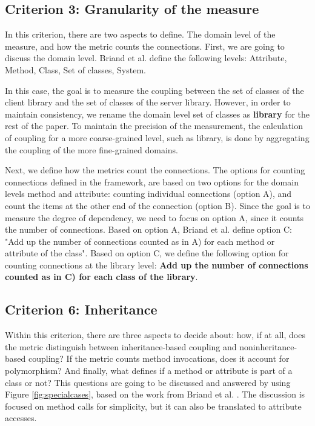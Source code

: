 \documentclass[a4paper]{article}
\begin{document}
\subsection{Criterion 3: Granularity of the measure}
In this criterion, there are two aspects to define. The domain level of the measure, and how the metric counts the connections. First, we are going to discuss the domain level. Briand et al. define the following levels: Attribute, Method, Class, Set of classes, System.

In this case, the goal is to measure the coupling between the set of classes of the client library and the set of classes of the server library. However, in order to maintain consistency, we rename the domain level set of classes as \textbf{library} for the rest of the paper. To maintain the precision of the measurement, the calculation of coupling for a more coarse-grained level, such as library, is done by aggregating the coupling of the more fine-grained domains.

Next, we define how the metrics count the connections. The options for counting connections defined in the framework, are based on two options for the domain levels method and attribute: counting individual connections (option A), and count the items at the other end of the connection (option B). Since the goal is to measure the degree of dependency, we need to focus on option A, since it counts the number of connections. Based on option A, Briand et al. define option C: "Add up the number of connections counted as in A) for each method or attribute of the class". Based on option C, we define the following option for counting connections at the library level: \textbf{Add up the number of connections counted as in C) for each class of the library}.

\subsection{Criterion 6: Inheritance}
Within this criterion, there are three aspects to decide about: how, if at all, does the metric distinguish between inheritance-based coupling and noninheritance-based coupling? If the metric counts method invocations, does it account for polymorphism? And finally, what defines if a method or attribute is part of a class or not? This questions are going to be discussed and answered by using Figure \ref{fig:specialcases}, based on the work from Briand et al. \cite{briand1999unified}. The discussion is focused on method calls for simplicity, but it can also be translated to attribute accesses.
\end{document}
